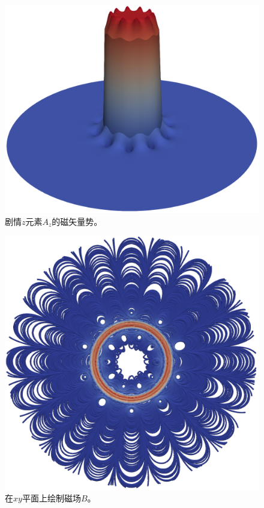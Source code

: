 \begin{figure}[!ht]  %
 \centerline{\includegraphics[width=0.95\linewidth]{fig/magnetostatics_potential.png}}
 \caption{
 剧情$z$元素$A_z$的磁矢量势。\label{ftut1:fig:magnetostatics:potential}
 }
\end{figure}

\begin{figure}[!ht]  %
 \centerline{\includegraphics[width=0.75\linewidth]{fig/magnetostatics_field.png}}
 \caption{
 在$xy$平面上绘制磁场$B$。\label{ftut1:fig:magnetostatics:field}
 }
\end{figure}

